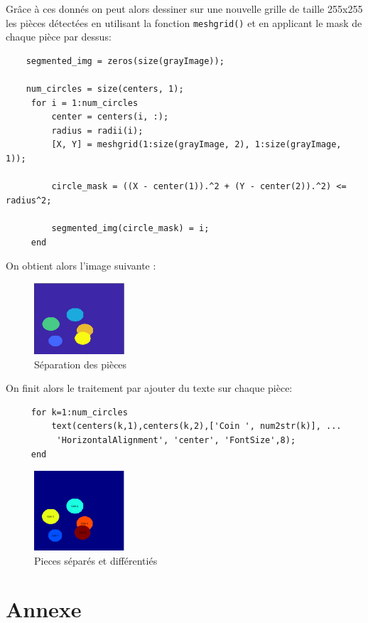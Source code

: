\documentclass[11pt, openright]{book}
\begin{document}
			Grâce à ces donnés on peut alors dessiner sur une nouvelle grille de taille 255x255 les pièces détectées en utilisant la fonction \texttt{meshgrid()} et en applicant le mask de chaque pièce par dessus:
			\begin{lstlisting}
    segmented_img = zeros(size(grayImage));

    num_circles = size(centers, 1);
     for i = 1:num_circles
         center = centers(i, :);
         radius = radii(i);
         [X, Y] = meshgrid(1:size(grayImage, 2), 1:size(grayImage, 1));
    
         circle_mask = ((X - center(1)).^2 + (Y - center(2)).^2) <= radius^2;
    
         segmented_img(circle_mask) = i;
     end
			\end{lstlisting}

			On obtient alors l'image suivante : 
			\begin{figure}[ht!]
				\centering
				\includegraphics[width=0.3\textwidth]{./object/g6.png}
				\caption{Séparation des pièces}
			\end{figure}

			On finit alors le traitement par ajouter du texte sur chaque pièce:
			\begin{lstlisting}
     for k=1:num_circles
         text(centers(k,1),centers(k,2),['Coin ', num2str(k)], ...
          'HorizontalAlignment', 'center', 'FontSize',8);
     end
			\end{lstlisting}

			\begin{figure}[ht!]
				\centering
				\includegraphics[width=0.3\textwidth]{./object/g7.png}
				\caption{Pieces séparés et différentiés}
			\end{figure}

\section{Annexe}
\end{document}
